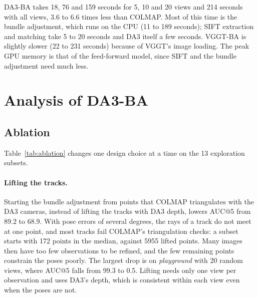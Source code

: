 \documentclass[10pt,twocolumn,letterpaper]{article}
\begin{document}
DA3-BA takes 18, 76 and 159 seconds for 5, 10 and 20 views and 214 seconds with all views, 3.6 to 6.6 times
less than COLMAP. Most of this time is the bundle adjustment, which runs on the CPU (11 to 189 seconds); SIFT
extraction and matching take 5 to 20 seconds and DA3 itself a few seconds. VGGT-BA is slightly slower
(22 to 231 seconds) because of VGGT's image loading. The peak GPU memory is that of the feed-forward model, since
SIFT and the bundle adjustment need much less.

\section{Analysis of DA3-BA}

\subsection{Ablation}
\label{sec:ablation}

\begin{table}[t]
\centering
\setlength{\tabcolsep}{4pt}

\caption{Design choices of DA3-BA on the 13 exploration subsets (\%), grouped into (a) subsets where COLMAP fails
or registers less than 60\% of the images (6), (b) subsets where COLMAP's cameras are much better than DA3's (4)
and (c) subsets where DA3 is already accurate (3). Each row below DA3-BA changes one choice.}
\label{tab:ablation}
\end{table}

Table~\ref{tab:ablation} changes one design choice at a time on the 13 exploration subsets.

\paragraph{Lifting the tracks.} Starting the bundle adjustment from points that COLMAP triangulates with the DA3
cameras, instead of lifting the tracks with DA3 depth, lowers AUC@5 from 89.2 to 68.9. With pose errors of
several degrees, the rays of a track do not meet at one point, and most tracks fail COLMAP's triangulation checks:
a subset starts with 172 points in the median, against 5955 lifted points. Many images then have too few observations
to be refined, and the few remaining points constrain the poses poorly. The largest drop is on
\emph{playground} with 20 random views, where AUC@5 falls from 99.3 to 0.5. Lifting needs only one view per
observation and uses DA3's depth, which is consistent within each view even when the poses are not.
\end{document}
